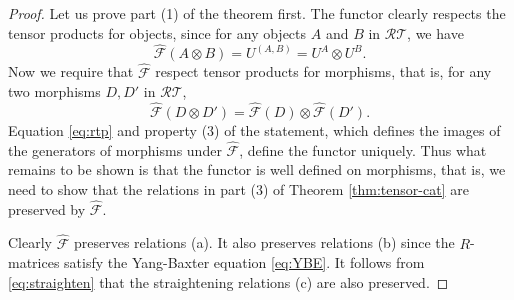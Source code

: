 \documentclass[12pt]{amsart}
\theoremstyle{definition}
\theoremstyle{remark}
\numberwithin{equation}{section}
\newcommand{\CF}{{\mathcal F}}
\newcommand{\be}{\begin{equation}}
\newcommand{\ee}{\end{equation}}
\newcommand{\RTC}{\mathcal{RT}}
\begin{document}
\begin{proof} 
Let us prove part (1) of the theorem first. 
The functor clearly respects the tensor products for objects, since for any objects $A$ and $B$ in $ \RTC$, we have 
\[
\widehat\CF(A\otimes B)= U^{(A, B)}= U^A\otimes U^B.
\]
Now we require that $\widehat\CF$ respect tensor products for morphisms, that is, for any two morphisms $D, D'$ in $ \RTC$, 
\be\label{eq:rtp}
\widehat\CF(D\otimes D')=\widehat\CF(D)\otimes \widehat\CF(D').
\ee
Equation \eqref{eq:rtp} and property (3) of the statement, which defines the images of the generators of morphisms under 
$\widehat\CF$,  define the functor uniquely. Thus what remains to be shown is that the functor is well 
defined on morphisms, that is, we need to show that  the relations in part (3) of Theorem \ref{thm:tensor-cat} 
are preserved by $\widehat\CF$. 

Clearly $\widehat\CF$ preserves relations (a). It also preserves relations (b) since the $R$-matrices 
satisfy the Yang-Baxter equation \eqref{eq:YBE}.  It follows from \eqref{eq:straighten} 
that the straightening relations (c) are also preserved. 


\end{proof}
\end{document}
